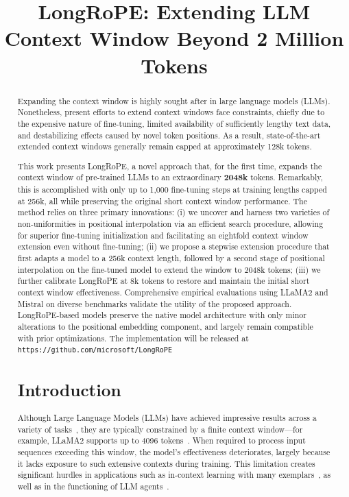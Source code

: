 \title{LongRoPE: Extending LLM Context Window Beyond 2 Million Tokens}

\begin{abstract}
Expanding the context window is highly sought after in large language models (LLMs). Nonetheless, present efforts to extend context windows face constraints, chiefly due to the expensive nature of fine-tuning, limited availability of sufficiently lengthy text data, and destabilizing effects caused by novel token positions. As a result, state-of-the-art extended context windows generally remain capped at approximately 128k tokens.

This work presents LongRoPE, a novel approach that, for the first time, expands the context window of pre-trained LLMs to an extraordinary \textbf{2048k} tokens. Remarkably, this is accomplished with only up to 1,000 fine-tuning steps at training lengths capped at 256k, all while preserving the original short context window performance. The method relies on three primary innovations: (i) we uncover and harness two varieties of non-uniformities in positional interpolation via an efficient search procedure, allowing for superior fine-tuning initialization and facilitating an eightfold context window extension even without fine-tuning; (ii) we propose a stepwise extension procedure that first adapts a model to a 256k context length, followed by a second stage of positional interpolation on the fine-tuned model to extend the window to 2048k tokens; (iii) we further calibrate LongRoPE at 8k tokens to restore and maintain the initial short context window effectiveness. Comprehensive empirical evaluations using LLaMA2 and Mistral on diverse benchmarks validate the utility of the proposed approach. LongRoPE-based models preserve the native model architecture with only minor alterations to the positional embedding component, and largely remain compatible with prior optimizations. The implementation will be released at \texttt{https://github.com/microsoft/LongRoPE}

\section{Introduction}

Although Large Language Models (LLMs) have achieved impressive results across a variety of tasks~\cite{gpt4,llama2}, they are typically constrained by a finite context window—for example, LLaMA2 supports up to 4096 tokens~\cite{llama2}. When required to process input sequences exceeding this window, the model's effectiveness deteriorates, largely because it lacks exposure to such extensive contexts during training. This limitation creates significant hurdles in applications such as in-context learning with many exemplars~\cite{Huang2023FewerIM}, as well as in the functioning of LLM agents~\cite{park2023generative,madaan2023selfrefine}.


\end{abstract}
